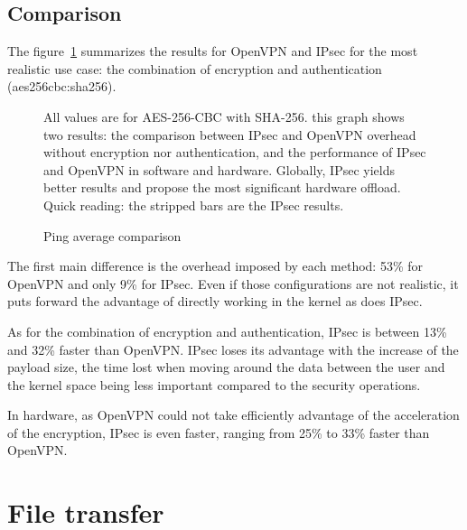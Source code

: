\subsection{Comparison}
The figure~\ref{fig:ping-benchmark-comparison} summarizes the results for OpenVPN and IPsec for the most realistic use case: the combination of encryption and authentication (aes256cbc:sha256).

\begin{figure}[ht]

\caption{Ping average comparison}{All values are for AES-256-CBC with SHA-256. this graph shows two results: the comparison between IPsec and OpenVPN overhead without encryption nor authentication, and the performance of IPsec and OpenVPN in software and hardware. Globally, IPsec yields better results and propose the most significant hardware offload. Quick reading: the stripped bars are the IPsec results.}
\label{fig:ping-benchmark-comparison}
\end{figure}

The first main difference is the overhead imposed by each method: 53\% for OpenVPN and only 9\% for IPsec.
Even if those configurations are not realistic, it puts forward the advantage of directly working in the kernel as does IPsec.

As for the combination of encryption and authentication, IPsec is between 13\% and 32\% faster than OpenVPN.
IPsec loses its advantage with the increase of the payload size, the time lost when moving around the data between the user and the kernel space being less important compared to the security operations.

\noindent In hardware, as OpenVPN could not take efficiently advantage of the acceleration of the encryption, IPsec is even faster, ranging from 25\% to 33\% faster than OpenVPN.














\section{File transfer}

